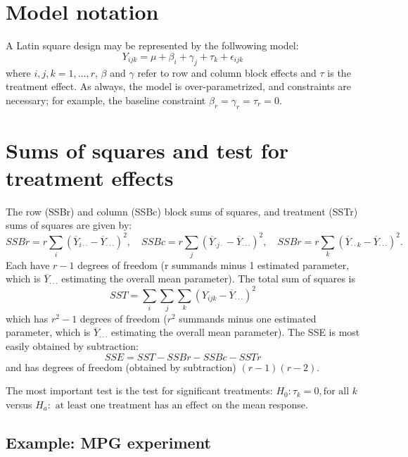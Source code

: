 \documentclass[
]{book}
\begin{document}
\hypertarget{model-notation}{%
\section{Model notation}\label{model-notation}}

A Latin square design may be represented by the follwowing model:
\[Y_{ijk} = \mu + \beta_i + \gamma_j + \tau_k + \epsilon_{ijk}\]
where \(i, j, k = 1, \ldots, r\), \(\beta\) and \(\gamma\) refer to row and column block effects and \(\tau\) is the treatment effect. As always, the model is over-parametrized, and constraints are necessary; for example, the baseline constraint \(\beta_r = \gamma_r = \tau_r = 0\).

\hypertarget{sums-of-squares-and-test-for-treatment-effects}{%
\section{Sums of squares and test for treatment effects}\label{sums-of-squares-and-test-for-treatment-effects}}

The row (SSBr) and column (SSBc) block sums of squares, and treatment (SSTr) sums of squares are given by:
\[SSBr = r\sum_{i}(\overline Y_{i\cdot\cdot} - \overline Y_{\cdot\cdot\cdot})^2, \quad SSBc = r\sum_{j}(\overline Y_{\cdot j\cdot} - \overline Y_{\cdot\cdot\cdot})^2, \quad SSBr = r\sum_{k}(\overline Y_{\cdot\cdot k} - \overline Y_{\cdot\cdot\cdot})^2.\]
Each have \(r-1\) degrees of freedom (r summands minus 1 estimated parameter, which is \(\overline Y_{\cdot\cdot\cdot}\) estimating the overall mean parameter). The total sum of squares is
\[SST = \sum_i\sum_j\sum_k(Y_{ijk} - \overline{Y}_{\cdot\cdot\cdot})^2\]
which has \(r^2 - 1\) degrees of freedom (\(r^2\) summands minus one estimated parameter, which is \(\overline Y_{\cdot\cdot\cdot}\) estimating the overall mean parameter). The SSE is most easily obtained by subtraction:
\[SSE = SST - SSBr - SSBc - SSTr\]
and has degrees of freedom (obtained by subtraction) \((r-1)(r-2)\).

The most important test is the test for significant treatments: \(H_0: \tau_k = 0, \text{for all } k\) versus \(H_a: \text{ at least one treatment has an effect}\) on the mean response.

\hypertarget{example-mpg-experiment-1}{%
\subsection{Example: MPG experiment}\label{example-mpg-experiment-1}}
\end{document}

